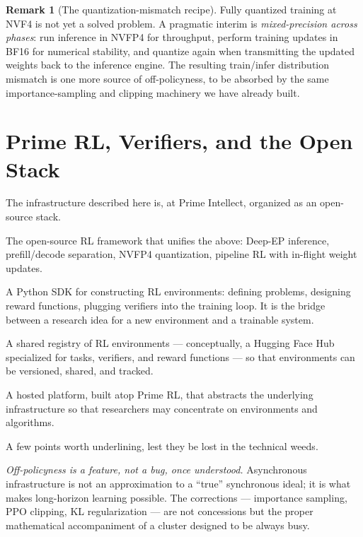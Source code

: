 \documentclass[11pt,a4paper]{article}
\theoremstyle{definition}
\newtheorem{remark}[definition]{Remark}
\theoremstyle{plain}
\begin{document}
\begin{remark}[The quantization-mismatch recipe]
Fully quantized training at NVF4 is not yet a solved problem. A pragmatic interim is \emph{mixed-precision across phases}: run inference in NVFP4 for throughput, perform training updates in BF16 for numerical stability, and quantize again when transmitting the updated weights back to the inference engine. The resulting train/infer distribution mismatch is one more source of off-policyness, to be absorbed by the same importance-sampling and clipping machinery we have already built.
\end{remark}

\section{Prime RL, Verifiers, and the Open Stack}

The infrastructure described here is, at Prime Intellect, organized as an open-source stack.

\begin{description}[style=nextline, leftmargin=0.6cm, itemsep=4pt]
  \item[\textbf{Prime RL}.] The open-source RL framework that unifies the above: Deep-EP inference, prefill/decode separation, NVFP4 quantization, pipeline RL with in-flight weight updates. 
  \item[\textbf{Verifier}.] A Python SDK for constructing RL environments: defining problems, designing reward functions, plugging verifiers into the training loop. It is the bridge between a research idea for a new environment and a trainable system.
  \item[\textbf{Environment Hub}.] A shared registry of RL environments --- conceptually, a Hugging Face Hub specialized for tasks, verifiers, and reward functions --- so that environments can be versioned, shared, and tracked.
  \item[\textbf{Prime Lab}.] A hosted platform, built atop Prime RL, that abstracts the underlying infrastructure so that researchers may concentrate on environments and algorithms.

\end{description}

A few points worth underlining, lest they be lost in the technical weeds.

\emph{Off-policyness is a feature, not a bug, once understood.} Asynchronous infrastructure is not an approximation to a ``true'' synchronous ideal; it is what makes long-horizon learning possible. The corrections --- importance sampling, PPO clipping, KL regularization --- are not concessions but the proper mathematical accompaniment of a cluster designed to be always busy.
\end{document}
